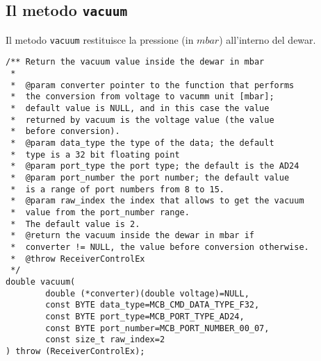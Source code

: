 \subsection{Il metodo \texttt{vacuum}}
Il metodo \texttt{vacuum} restituisce la pressione 
(in $mbar$) all'interno del dewar.
\lstset{language=C++}
\begin{lstlisting}[caption={Dichiarazione del metodo \texttt{vacuum}},
label=lst:vacuum,mathescape]
/** Return the vacuum value inside the dewar in mbar
 *
 *  @param converter pointer to the function that performs 
 *  the conversion from voltage to vacumm unit [mbar]; 
 *  default value is NULL, and in this case the value
 *  returned by vacuum is the voltage value (the value 
 *  before conversion).
 *  @param data_type the type of the data; the default 
 *  type is a 32 bit floating point
 *  @param port_type the port type; the default is the AD24
 *  @param port_number the port number; the default value 
 *  is a range of port numbers from 8 to 15.
 *  @param raw_index the index that allows to get the vacuum 
 *  value from the port_number range.
 *  The default value is 2.
 *  @return the vacuum inside the dewar in mbar if 
 *  converter != NULL, the value before conversion otherwise.
 *  @throw ReceiverControlEx
 */
double vacuum(
        double (*converter)(double voltage)=NULL,
        const BYTE data_type=MCB_CMD_DATA_TYPE_F32,     
        const BYTE port_type=MCB_PORT_TYPE_AD24,       
        const BYTE port_number=MCB_PORT_NUMBER_00_07,  
        const size_t raw_index=2                      
) throw (ReceiverControlEx);
\end{lstlisting}
\lstset{numbers=none}



